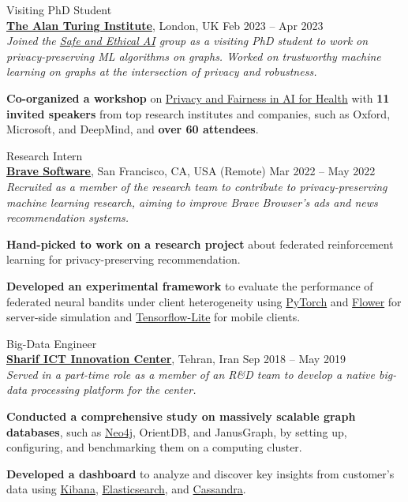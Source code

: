 \documentclass[11pt]{article}
\begin{document}
\begin{outerlist}
	\item {Visiting PhD Student}\\ 
	\textbf{\href{https://www.turing.ac.uk/}{The Alan Turing Institute}}, London, UK \hfill {Feb 2023 -- Apr 2023}\\
  \textit{Joined the \href{https://www.turing.ac.uk/research/research-programmes/artificial-intelligence-ai/safe-and-ethical}{Safe and Ethical AI} group as a visiting PhD student to work on privacy-preserving ML algorithms on graphs. Worked on trustworthy machine learning on graphs at the intersection of privacy and robustness.}
	\begin{innerlist}
		\item \textbf{Co-organized a workshop} on \href{https://private-fair-ai.github.io/}{Privacy and Fairness in AI for Health} with \textbf{11 invited speakers} from top research institutes and companies, such as {Oxford}, {Microsoft}, and {DeepMind}, and \textbf{over 60 attendees}.
	\end{innerlist}

	\item {Research Intern}\\
	\textbf{\href{https://brave.com/}{Brave Software}}, San Francisco, CA, USA (Remote) \hfill {Mar 2022 -- May 2022}\\
  \textit{Recruited as a member of the research team to contribute to privacy-preserving machine learning research, aiming to improve Brave Browser's ads and news recommendation systems.}
	\begin{innerlist}
		\item \textbf{Hand-picked to work on a research project} about federated reinforcement learning for privacy-preserving recommendation.
		\item \textbf{Developed an experimental framework} to evaluate the performance of federated neural bandits under client heterogeneity using \href{https://pytorch.org/}{PyTorch} and \href{https://flower.dev/}{Flower} for server-side simulation and \href{https://www.tensorflow.org/lite}{Tensorflow-Lite} for mobile clients.
	\end{innerlist}


	\item {Big-Data Engineer} \\
	\href{http://ictic.sharif.ir}{\textbf{Sharif ICT Innovation Center}}, Tehran, Iran \hfill {Sep 2018 -- May 2019}\\
  \textit{Served in a part-time role as a member of an R\&D team to develop a native big-data processing platform for the center.}
	\begin{innerlist}
		\item \textbf{Conducted a comprehensive study on massively scalable graph databases}, such as \href{https://neo4j.com/}{Neo4j}, OrientDB, and JanusGraph, by setting up, configuring, and benchmarking them on a computing cluster.
		\item \textbf{Developed a dashboard} to analyze and discover key insights from customer's data using \href{https://www.elastic.co/kibana}{Kibana}, \href{https://www.elastic.co/elasticsearch/}{Elasticsearch}, and \href{https://cassandra.apache.org/}{Cassandra}.
	\end{innerlist}



\end{outerlist}
\end{document}
